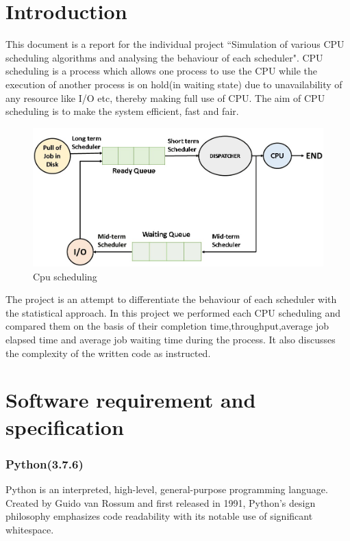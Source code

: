 \documentclass[11pt,a4paper]{report}
\begin{document}
\chapter{Introduction}
\vskip 1cm
This document is a report for the individual project ``Simulation of various CPU scheduling algorithms and analysing the behaviour of each scheduler". CPU scheduling is a process which allows one process to use the CPU while the execution of another process is on hold(in waiting state) due to unavailability of any resource like I/O etc, thereby making full use of CPU. The aim of CPU scheduling is to make the system efficient, fast and fair.\\ 
\vskip 1cm
\begin{figure}[H]
\centering
\includegraphics[scale=0.5]{./img/cpu.jpg}
\caption{Cpu scheduling}
\end{figure}

The project is an attempt to differentiate the behaviour of each scheduler with the statistical approach. In this project we performed each CPU scheduling and compared them on the basis of their completion time,throughput,average job elapsed time and average job waiting time during the process. It also discusses the complexity of the written code as instructed.


\chapter{Software requirement and specification}

\subsection*{Python(3.7.6)}
{Python is an interpreted, high-level, general-purpose programming language. Created by Guido van Rossum and first released in 1991, Python's design philosophy emphasizes code readability with its notable use of significant whitespace.}
\end{document}
